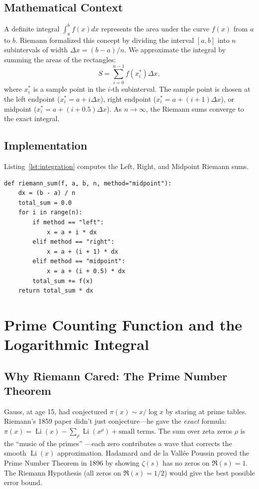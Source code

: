 \documentclass[11pt]{amsart}
\theoremstyle{definition}
\begin{document}
\subsection{Mathematical Context}
A definite integral $\int_a^b f(x)dx$ represents the area under the curve $f(x)$ from $a$ to $b$. Riemann formalized this concept by dividing the interval $[a,b]$ into $n$ subintervals of width $\Delta x = (b-a)/n$. We approximate the integral by summing the areas of the rectangles:
\begin{equation}
\label{eq:riemann_sum}
S = \sum_{i=0}^{n-1} f(x_i^*) \Delta x,
\end{equation}
where $x_i^*$ is a sample point in the $i$-th subinterval. The sample point is chosen at the left endpoint ($x_i^* = a + i\Delta x$), right endpoint ($x_i^* = a + (i+1)\Delta x$), or midpoint ($x_i^* = a + (i+0.5)\Delta x$). As $n \to \infty$, the Riemann sums converge to the exact integral.

\subsection{Implementation}
Listing~\ref{lst:integration} computes the Left, Right, and Midpoint Riemann sums.

\begin{lstlisting}[caption={Riemann integration sum calculation.}, label={lst:integration}]
def riemann_sum(f, a, b, n, method="midpoint"):
    dx = (b - a) / n
    total_sum = 0.0
    for i in range(n):
        if method == "left":
            x = a + i * dx
        elif method == "right":
            x = a + (i + 1) * dx
        elif method == "midpoint":
            x = a + (i + 0.5) * dx
        total_sum += f(x)
    return total_sum * dx
\end{lstlisting}

\section{Prime Counting Function and the Logarithmic Integral}
\label{sec:prime}

\subsection{Why Riemann Cared: The Prime Number Theorem}
Gauss, at age 15, had conjectured $\pi(x) \sim x/\log x$ by staring at prime tables. Riemann's 1859 paper didn't just conjecture---he gave the \textit{exact} formula: $\pi(x) = \operatorname{Li}(x) - \sum_\rho \operatorname{Li}(x^\rho) + \text{small terms}$. The sum over zeta zeros $\rho$ is the ``music of the primes'' \cite{du_sautoy_2003}---each zero contributes a wave that corrects the smooth $\operatorname{Li}(x)$ approximation. Hadamard and de la Vallée Poussin proved the Prime Number Theorem in 1896 by showing $\zeta(s)$ has no zeros on $\Re(s)=1$. The Riemann Hypothesis (all zeros on $\Re(s)=1/2$) would give the best possible error bound.
\end{document}
